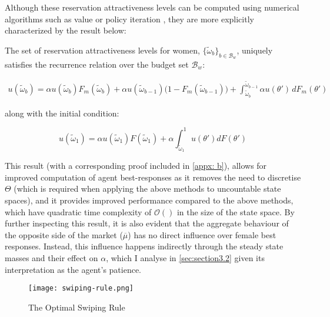 Although these reservation attractiveness levels can be computed using numerical algorithms such as value or policy iteration \citep{rust1987optimal}, they are more explicitly characterized by the result below: 

\begin{proposition}
The set of reservation attractiveness levels for women, $\{\tilde\omega_b\}_{b\in \mathcal{B}_w}$, uniquely satisfies the recurrence relation over the budget set $\mathcal{B}_w$: 

\begin{equation}\label{eq:recurrence relation}
    \begin{aligned}
        u(\widetilde \omega_b) = \alpha u(\widetilde \omega_b) F_m(\widetilde \omega_b) + \alpha u(\widetilde \omega_{b-1})\Big(1- F_m(\widetilde \omega_{b-1})\Big)+\int^{\widetilde \omega_{b-1}}_{\widetilde \omega_b} \alpha u(\theta')\,dF_m(\theta')
    \end{aligned} 
\end{equation}

along with the initial condition:

\begin{equation}\label{eq:initial condition}
    u(\widetilde\omega_1) =\alpha u(\widetilde\omega_1)F(\widetilde\omega_1) + \alpha \int^1_{\widetilde\omega_1}u(\theta')dF(\theta')
\end{equation}
\end{proposition} 

This result (with a corresponding proof included in \autoref{appx: b}), allows for improved computation of agent best-responses as it removes the need to discretise $\Theta$ (which is required when applying the above methods to uncountable state spaces), and it provides improved performance compared to the above methods, which have quadratic time complexity of $\mathcal{O}()$ in the size of the state space. By further inspecting this result, it is also evident that the aggregate behaviour of the opposite side of the market ($\overline\mu$) has no direct influence over female best responses. Instead, this influence happens indirectly through the steady state masses and their effect on $\alpha$, which I analyse in \autoref{sec:section3.2} given its interpretation as the agent's patience. 

\begin{figure}[ht]\label{fig:swiping-rule} 
    \centering
    \caption{The Optimal Swiping Rule}
    \texttt{[image: swiping-rule.png]}
\end{figure}
